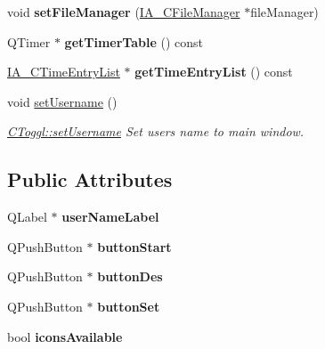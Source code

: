 \begin{DoxyCompactItemize}
void {\bfseries set\+File\+Manager} (\hyperlink{classIA__CFileManager}{I\+A\+\_\+\+C\+File\+Manager} $\ast$file\+Manager)
\item 
\mbox{\label{classCToggl_af3fc8ea0bb454f3565bb936376d899ca}} 
Q\+Timer $\ast$ {\bfseries get\+Timer\+Table} () const
\item 
\mbox{\label{classCToggl_a57d5a99ec3a700375d4944356cd31334}} 
\hyperlink{classIA__CTimeEntryList}{I\+A\+\_\+\+C\+Time\+Entry\+List} $\ast$ {\bfseries get\+Time\+Entry\+List} () const
\item 
\mbox{\label{classCToggl_aadbaa69599ba88301d950b1516b804d7}} 
void \hyperlink{classCToggl_aadbaa69599ba88301d950b1516b804d7}{set\+Username} ()
\begin{DoxyCompactList}\small\item\em \hyperlink{classCToggl_aadbaa69599ba88301d950b1516b804d7}{C\+Toggl\+::set\+Username} Set user\textquotesingle{}s name to main window. \end{DoxyCompactList}\end{DoxyCompactItemize}
\subsection*{Public Attributes}
\begin{DoxyCompactItemize}
\item 
\mbox{\label{classCToggl_a8799d38062d9dc486100c90731d3de0a}} 
Q\+Label $\ast$ {\bfseries user\+Name\+Label}
\item 
\mbox{\label{classCToggl_ae185359645b26cc8153800c62045c74e}} 
Q\+Push\+Button $\ast$ {\bfseries button\+Start}
\item 
\mbox{\label{classCToggl_a1ccd521771e4e947fd35035350fbddfe}} 
Q\+Push\+Button $\ast$ {\bfseries button\+Des}
\item 
\mbox{\label{classCToggl_a9178120cdd87b59ed114e4fc4f43d75a}} 
Q\+Push\+Button $\ast$ {\bfseries button\+Set}
\item 
\mbox{\label{classCToggl_a4f2e98a9731ac37dd663ad2d408a0177}} 
bool {\bfseries icons\+Available}
\end{DoxyCompactItemize}


